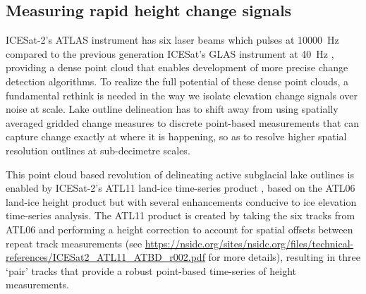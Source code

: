 
%


\subsection{Measuring rapid height change signals}

ICESat-2's ATLAS instrument has six laser beams which pulses at \SI{10000}{\hertz} compared to the previous generation ICESat's GLAS instrument at \SI{40}{\hertz} \citep{MarkusIceCloudland2017}, providing a dense point cloud that enables development of more precise change detection algorithms.
To realize the full potential of these dense point clouds, a fundamental rethink is needed in the way we isolate elevation change signals over noise at scale.
Lake outline delineation has to shift away from using spatially averaged gridded change measures \citep[c.f.][]{Smithinventoryactivesubglacial2009,SiegfriedThirteenyearssubglacial2018} to discrete point-based measurements that can capture change exactly at where it is happening, so as to resolve higher spatial resolution outlines at sub-decimetre scales.

This point cloud based revolution of delineating active subglacial lake outlines is enabled by ICESat-2's ATL11 land-ice time-series product \citep{SmithATLASICESat2L3B2021}, based on the ATL06 land-ice height product \citep{SmithLandiceheightretrieval2019} but with several enhancements conducive to ice elevation time-series analysis.
The ATL11 product \citep{SmithATLASICESat2L3B2021} is created by taking the six tracks from ATL06 and performing a height correction to account for spatial offsets between repeat track measurements (see \url{https://nsidc.org/sites/nsidc.org/files/technical-references/ICESat2_ATL11_ATBD_r002.pdf} for more details), resulting in three `pair' tracks that provide a robust point-based time-series of height measurements.


